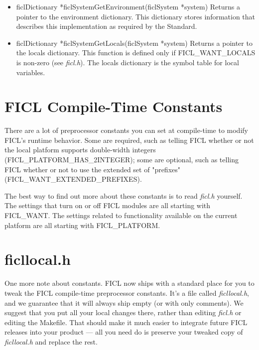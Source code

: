 \begin{itemize}[noitemsep]
	\item ficlDictionary *ficlSystemGetEnvironment(ficlSystem
		*system)\newline
	Returns a pointer to the environment dictionary. This dictionary
	stores information that describes this implementation as
	required by the Standard.

	\item ficlDictionary *ficlSystemGetLocals(ficlSystem
		*system)\newline
	Returns a pointer to the locals dictionary. This function is
	defined only if FICL\_WANT\_LOCALS is non-zero (see
	\textit{ficl.h}). The locals dictionary is the symbol table for
	local variables.
\end{itemize}

\section{FICL Compile-Time Constants}
There are a lot of preprocessor constants you can set at compile-time
to modify FICL's runtime behavior. Some are required, such as telling
FICL whether or not the local platform supports double-width integers
(FICL\_PLATFORM\_HAS\_2INTEGER); some are optional, such as telling FICL
whether or not to use the extended set of "prefixes"
(FICL\_WANT\_EXTENDED\_PREFIXES).

The best way to find out more about these constants is to read
\textit{ficl.h} yourself. The settings that turn on or off FICL modules
are all starting with FICL\_WANT. The settings related to functionality
available on the current platform are all starting with FICL\_PLATFORM.


\section{ficllocal.h}
One more note about constants. FICL now ships with a standard place for
you to tweak the FICL compile-time preprocessor constants. It's a file
called \textit{ficllocal.h}, and we guarantee that it will always ship
empty (or with only comments). We suggest that you put all your local
changes there, rather than editing \textit{ficl.h} or editing the
Makefile. That should make it much easier to integrate future FICL
releases into your product — all you need do is preserve your tweaked
copy of \textit{ficllocal.h} and replace the rest.
